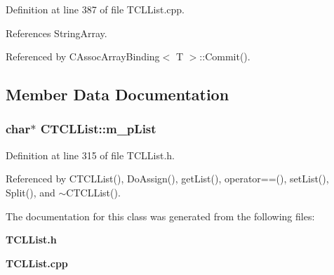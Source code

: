Definition at line 387 of file TCLList.cpp.

References String\-Array.

Referenced by CAssoc\-Array\-Binding$<$ T $>$::Commit().

\subsection{Member Data Documentation}
\subsubsection{\setlength{\rightskip}{0pt plus 5cm}char$\ast$ CTCLList::m\_\-p\-List\hspace{0.3cm}{\tt  [private]}}\label{classCTCLList_o0}




Definition at line 315 of file TCLList.h.

Referenced by CTCLList(), Do\-Assign(), get\-List(), operator==(), set\-List(), Split(), and $\sim$CTCLList().

The documentation for this class was generated from the following files:\begin{CompactItemize}
\item 
{\bf TCLList.h}\item 
{\bf TCLList.cpp}\end{CompactItemize}
